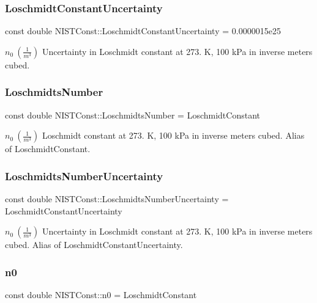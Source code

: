 \subsubsection{\texorpdfstring{Loschmidt\+Constant\+Uncertainty}{LoschmidtConstantUncertainty}}
{\footnotesize\ttfamily const double N\+I\+S\+T\+Const\+::\+Loschmidt\+Constant\+Uncertainty = 0.\+0000015e25}

$n_0 \ (\frac{1}{m^3})$ Uncertainty in Loschmidt constant at 273. K, 100 k\+Pa in inverse meters cubed. \mbox{\label{group___loschmidt_constant_gaf6143a6202718104ded1b92da2a0217f}} 
\subsubsection{\texorpdfstring{Loschmidts\+Number}{LoschmidtsNumber}}
{\footnotesize\ttfamily const double N\+I\+S\+T\+Const\+::\+Loschmidts\+Number = Loschmidt\+Constant}

$n_0 \ (\frac{1}{m^3})$ Loschmidt constant at 273. K, 100 k\+Pa in inverse meters cubed. Alias of Loschmidt\+Constant. \mbox{\label{group___loschmidt_constant_gab851db21b311f09798d0df42d2e25f3f}} 
\subsubsection{\texorpdfstring{Loschmidts\+Number\+Uncertainty}{LoschmidtsNumberUncertainty}}
{\footnotesize\ttfamily const double N\+I\+S\+T\+Const\+::\+Loschmidts\+Number\+Uncertainty = Loschmidt\+Constant\+Uncertainty}

$n_0 \ (\frac{1}{m^3})$ Uncertainty in Loschmidt constant at 273. K, 100 k\+Pa in inverse meters cubed. Alias of Loschmidt\+Constant\+Uncertainty. \mbox{\label{group___loschmidt_constant_ga95b0a12ed1a4d5aa9f05a08927be123c}} 
\subsubsection{\texorpdfstring{n0}{n0}}
{\footnotesize\ttfamily const double N\+I\+S\+T\+Const\+::n0 = Loschmidt\+Constant}

